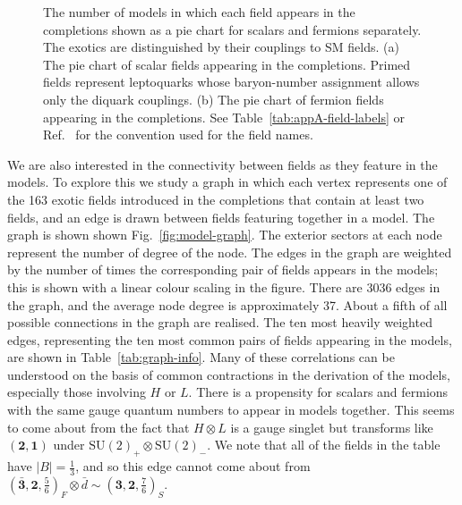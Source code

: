 \begin{figure}
  \centering
  \caption{The number of models in which each field appears in the completions
    shown as a pie chart for scalars and fermions separately. The exotics are
    distinguished by their couplings to SM fields. (a) The pie chart of scalar
    fields appearing in the completions. Primed fields represent leptoquarks
    whose baryon-number assignment allows only the diquark couplings. (b) The
    pie chart of fermion fields appearing in the completions. See
    Table~\ref{tab:appA-field-labels} or Ref.~\cite{deBlas:2017xtg} for the
    convention used for the field names.}
  \label{fig:field-piecharts}
\end{figure}

We are also interested in the connectivity between fields as they feature in the
models. To explore this we study a graph in which each vertex represents one of
the 163 exotic fields introduced in the completions that contain at least two
fields, and an edge is drawn between fields featuring together in a model. The
graph is shown shown Fig.~\ref{fig:model-graph}. The exterior sectors at each
node represent the number of degree of the node. The edges in the graph are
weighted by the number of times the corresponding pair of fields appears in the
models; this is shown with a linear colour scaling in the figure. There are 3036
edges in the graph, and the average node degree is approximately 37. About a
fifth of all possible connections in the graph are realised. The ten most
heavily weighted edges, representing the ten most common pairs of fields
appearing in the models, are shown in Table~\ref{tab:graph-info}. Many of these
correlations can be understood on the basis of common contractions in the
derivation of the models, especially those involving $H$ or $L$. There is a
propensity for scalars and fermions with the same gauge quantum numbers to
appear in models together. This seems to come about from the fact that
$H \otimes L$ is a gauge singlet but transforms like $(\mathbf{2}, \mathbf{1})$
under $\mathrm{SU}(2)_{+} \otimes \mathrm{SU}(2)_{-}$. We note that all of the
fields in the table have $|B| = \tfrac{1}{3}$, and so this edge cannot come
about from
$(\mathbf{\bar{3}}, \mathbf{2}, \tfrac{5}{6})_{F} \otimes \bar{d} \sim (\mathbf{3}, \mathbf{2}, \tfrac{7}{6})_{S}$.

